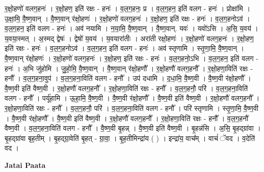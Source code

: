 \documentclass[17pt]{extarticle}
\begin{document}
र॒क्षो॒हणो॑ वलग॒हनः॑ । र॒क्षो॒हण॒ इति॑ रक्षः - हनः॑ । व॒ल॒ग॒हनः॒ प्र । व॒ल॒ग॒हन॒ इति॑ वलग - हनः॑ । प्रोक्षा॑मि । उ॒क्षा॒मि॒ वै॒ष्ण॒वान् । वै॒ष्ण॒वान् र॑क्षो॒हणः॑ । र॒क्षो॒हणो॑ वलग॒हनः॑ । र॒क्षो॒हण॒ इति॑ रक्षः - हनः॑ । व॒ल॒ग॒हनोऽव॑ । व॒ल॒ग॒हन॒ इति॑ वलग - हनः॑ । अव॑ नयामि । न॒या॒मि॒ वै॒ष्ण॒वान् । वै॒ष्ण॒वान्. यवः॑ । यवो॑ऽसि । अ॒सि॒ य॒वय॑ । य॒वया॒स्मत् । अ॒स्मद् द्वेषः॑ । द्वेषो॑ य॒वय॑ । य॒वयारा॑तीः । अरा॑ती रक्षो॒हणः॑ । र॒क्षो॒हणो॑ वलग॒हनः॑ । र॒क्षो॒हण॒ इति॑ रक्षः - हनः॑ । व॒ल॒ग॒हनोऽव॑ । व॒ल॒ग॒हन॒ इति॑ वलग - हनः॑ । अव॑ स्तृणामि । स्तृ॒णा॒मि॒ वै॒ष्ण॒वान् । वै॒ष्ण॒वान् र॑क्षो॒हणः॑ । र॒क्षो॒हणो॑ वलग॒हनः॑ । र॒क्षो॒हण॒ इति॑ रक्षः - हनः॑ । व॒ल॒ग॒हनो॒ऽभि । व॒ल॒ग॒हन॒ इति॑ वलग - हनः॑ । अ॒भि जु॑होमि । जु॒हो॒मि॒ वै॒ष्ण॒वान् । वै॒ष्ण॒वान् र॑क्षो॒हणौ᳚ । र॒क्षो॒हणौ॑ वलग॒हनौ᳚ । र॒क्षो॒हणा॒विति॑ रक्षः - हनौ᳚ । व॒ल॒ग॒हना॒वुप॑ । व॒ल॒ग॒हना॒विति॑ वलग - हनौ᳚ । उप॑ दधामि । द॒धा॒मि॒ वै॒ष्ण॒वी । वै॒ष्ण॒वी र॑क्षो॒हणौ᳚ । वै॒ष्ण॒वी इति॑ वैष्ण॒वी । र॒क्षो॒हणौ॑ वलग॒हनौ᳚ । र॒क्षो॒हणा॒विति॑ रक्षः - हनौ᳚ । व॒ल॒ग॒हनौ॒ परि॑ । व॒ल॒ग॒हना॒विति॑ वलग - हनौ᳚ । पर्यू॑हामि । ऊ॒हा॒मि॒ वै॒ष्ण॒वी । वै॒ष्ण॒वी र॑क्षो॒हणौ᳚ । वै॒ष्ण॒वी इति॑ वैष्ण॒वी । र॒क्षो॒हणौ॑ वलग॒हनौ᳚ । र॒क्षो॒हणा॒विति॑ रक्षः - हनौ᳚ । व॒ल॒ग॒हनौ॒ परि॑ । व॒ल॒ग॒हना॒विति॑ वलग - हनौ᳚ । परि॑ स्तृणामि । स्तृ॒णा॒मि॒ वै॒ष्ण॒वी । वै॒ष्ण॒वी र॑क्षो॒हणौ᳚ । वै॒ष्ण॒वी इति॑ वैष्ण॒वी । र॒क्षो॒हणौ॑ वलग॒हनौ᳚ । र॒क्षो॒हणा॒विति॑ रक्षः - हनौ᳚ । व॒ल॒ग॒हनौ॑ वैष्ण॒वी । व॒ल॒ग॒हना॒विति॑ वलग - हनौ᳚ । वै॒ष्ण॒वी बृ॒हन्न् । वै॒ष्ण॒वी इति॑ वैष्ण॒वी । बृ॒हन्न॑सि । अ॒सि॒ बृ॒हद्ग्रा॑वा । बृ॒हद्ग्रा॑वा बृह॒तीम् । बृ॒हद्ग्रा॒वेति॑ बृ॒हत् - ग्रा॒वा॒ । बृ॒ह॒तीमिन्द्रा॑य ( ) । इन्द्रा॑य॒ वाच᳚म् । वाचं॑ ॅवद । व॒देति॑ वद । \newline

\textbf{Jatai Paata} \newline
\end{document}
